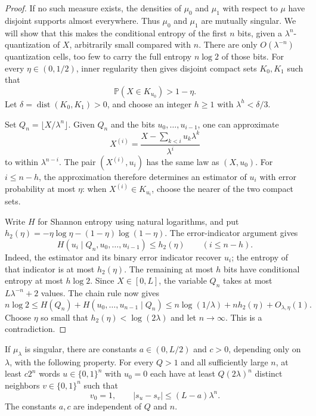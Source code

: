 \begin{proof}
If no such measure exists, the densities of $\mu_0$ and $\mu_1$ with
respect to $\mu$ have disjoint supports almost everywhere.  Thus
$\mu_0$ and $\mu_1$ are mutually singular.  We will show that this
makes the conditional entropy of the first $n$ bits, given a
$\lambda^n$-quantization of $X$, arbitrarily small compared with $n$.
There are only $O(\lambda^{-n})$ quantization cells, too few to carry
the full entropy $n\log2$ of those bits.
For every $\eta\in(0,1/2)$,
inner regularity then gives disjoint compact sets $K_0,K_1$ such that
\[
  \mathbb P(X\in K_{u_0})>1-\eta.
\]
Let $\delta=\operatorname{dist}(K_0,K_1)>0$, and choose an integer
$h\geq1$ with $\lambda^h<\delta/3$.

Set $Q_n=\lfloor X/\lambda^n\rfloor$.  Given $Q_n$ and the bits
$u_0,\ldots,u_{i-1}$, one can approximate
\[
  X^{(i)}=\frac{X-\sum_{k<i}u_k\lambda^k}{\lambda^i}
\]
to within $\lambda^{n-i}$.  The pair $(X^{(i)},u_i)$ has the same law
as $(X,u_0)$.  For $i\leq n-h$, the approximation therefore determines
an estimator of $u_i$ with error probability at most $\eta$: when
$X^{(i)}\in K_{u_i}$, choose the nearer of the two compact sets.

Write $H$ for Shannon entropy using natural logarithms, and put
$h_2(\eta)=-\eta\log\eta-(1-\eta)\log(1-\eta)$.
The error-indicator argument gives
\[
  H(u_i\mid Q_n,u_0,\ldots,u_{i-1})\leq h_2(\eta)
  \qquad(i\leq n-h).
\]
Indeed, the estimator and its binary error indicator recover $u_i$;
the entropy of that indicator is at most $h_2(\eta)$.
The remaining at most $h$ bits have conditional entropy at most
$h\log2$.  Since $X\in[0,L]$, the variable $Q_n$ takes at most
$L\lambda^{-n}+2$ values.  The chain rule now gives
\[
  n\log2
  \leq H(Q_n)+H(u_0,\ldots,u_{n-1}\mid Q_n)
  \leq n\log(1/\lambda)+n h_2(\eta)+O_{\lambda,\eta}(1).
\]
Choose $\eta$ so small that $h_2(\eta)<\log(2\lambda)$ and let
$n\to\infty$.  This is a contradiction.
\end{proof}

\begin{proposition}
\label{cls:cross-pairs}
If $\mu_\lambda$ is singular, there are constants $a\in(0,L/2)$ and
$c>0$, depending only on $\lambda$, with the following property.
For every $Q>1$ and all sufficiently large $n$, at least $c2^n$ words
$u\in\{0,1\}^n$ with $u_0=0$ each have at least $Q(2\lambda)^n$
distinct neighbors $v\in\{0,1\}^n$ such that
\begin{equation}
  v_0=1,
  \qquad |s_u-s_v|\leq(L-a)\lambda^n.
  \label{cls:cross-pair-bound}
\end{equation}
The constants $a,c$ are independent of $Q$ and $n$.
\end{proposition}

